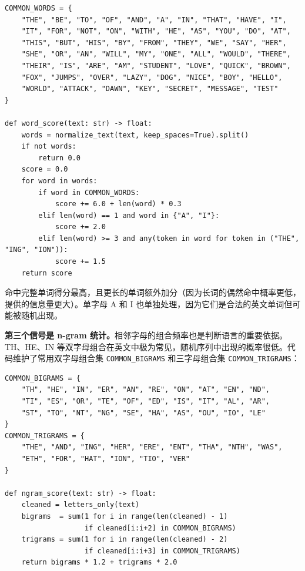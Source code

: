 \documentclass[12pt, a4paper]{article}
\begin{document}
\begin{lstlisting}[style=python, caption={常用单词集合与单词评分函数（common.py）}]
COMMON_WORDS = {
    "THE", "BE", "TO", "OF", "AND", "A", "IN", "THAT", "HAVE", "I",
    "IT", "FOR", "NOT", "ON", "WITH", "HE", "AS", "YOU", "DO", "AT",
    "THIS", "BUT", "HIS", "BY", "FROM", "THEY", "WE", "SAY", "HER",
    "SHE", "OR", "AN", "WILL", "MY", "ONE", "ALL", "WOULD", "THERE",
    "THEIR", "IS", "ARE", "AM", "STUDENT", "LOVE", "QUICK", "BROWN",
    "FOX", "JUMPS", "OVER", "LAZY", "DOG", "NICE", "BOY", "HELLO",
    "WORLD", "ATTACK", "DAWN", "KEY", "SECRET", "MESSAGE", "TEST"
}

def word_score(text: str) -> float:
    words = normalize_text(text, keep_spaces=True).split()
    if not words:
        return 0.0
    score = 0.0
    for word in words:
        if word in COMMON_WORDS:
            score += 6.0 + len(word) * 0.3
        elif len(word) == 1 and word in {"A", "I"}:
            score += 2.0
        elif len(word) >= 3 and any(token in word for token in ("THE", "ING", "ION")):
            score += 1.5
    return score
\end{lstlisting}

命中完整单词得分最高，且更长的单词额外加分（因为长词的偶然命中概率更低，提供的信息量更大）。单字母 A 和 I 也单独处理，因为它们是合法的英文单词但可能被随机出现。

\textbf{第三个信号是 n-gram 统计。}相邻字母的组合频率也是判断语言的重要依据。TH、HE、IN 等双字母组合在英文中极为常见，随机序列中出现的概率很低。代码维护了常用双字母组合集 \texttt{COMMON\_BIGRAMS} 和三字母组合集 \texttt{COMMON\_TRIGRAMS}：

\begin{lstlisting}[style=python, caption={n-gram 集合与 n-gram 评分函数（common.py）}]
COMMON_BIGRAMS = {
    "TH", "HE", "IN", "ER", "AN", "RE", "ON", "AT", "EN", "ND",
    "TI", "ES", "OR", "TE", "OF", "ED", "IS", "IT", "AL", "AR",
    "ST", "TO", "NT", "NG", "SE", "HA", "AS", "OU", "IO", "LE"
}
COMMON_TRIGRAMS = {
    "THE", "AND", "ING", "HER", "ERE", "ENT", "THA", "NTH", "WAS",
    "ETH", "FOR", "HAT", "ION", "TIO", "VER"
}

def ngram_score(text: str) -> float:
    cleaned = letters_only(text)
    bigrams  = sum(1 for i in range(len(cleaned) - 1)
                   if cleaned[i:i+2] in COMMON_BIGRAMS)
    trigrams = sum(1 for i in range(len(cleaned) - 2)
                   if cleaned[i:i+3] in COMMON_TRIGRAMS)
    return bigrams * 1.2 + trigrams * 2.0
\end{lstlisting}
\end{document}
